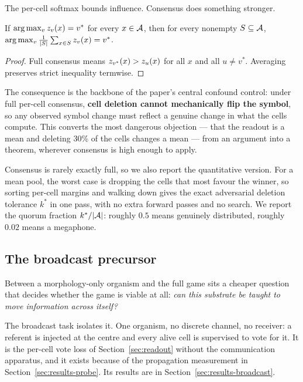 The per-cell softmax bounds influence. Consensus does something stronger.

\begin{proposition}
\label{prop:deletion}
If $\arg\max_v z_v(x) = v^{*}$ for every $x \in \mathcal{A}$, then for every
nonempty $S \subseteq \mathcal{A}$,
$\arg\max_v \frac{1}{|S|}\sum_{x \in S} z_v(x) = v^{*}$.
\end{proposition}

\begin{proof}
Full consensus means $z_{v^{*}}(x) > z_u(x)$ for all $x$ and all
$u \neq v^{*}$. Averaging preserves strict inequality termwise.
\end{proof}

The consequence is the backbone of the paper's central confound control: under
full per-cell consensus, \textbf{cell deletion cannot mechanically flip the
symbol}, so any observed symbol change must reflect a genuine change in what the
cells compute. This converts the most dangerous objection --- that the readout is
a mean and deleting 30\% of the cells changes a mean --- from an argument into a
theorem, wherever consensus is high enough to apply.

Consensus is rarely exactly full, so we also report the quantitative version. For
a mean pool, the worst case is dropping the cells that most favour the winner, so
sorting per-cell margins and walking down gives the exact adversarial deletion
tolerance $k^{*}$ in one pass, with no extra forward passes and no search. We
report the quorum fraction $k^{*}/|\mathcal{A}|$: roughly $0.5$ means genuinely
distributed, roughly $0.02$ means a megaphone.

\subsection{The broadcast precursor}
\label{sec:broadcast}

Between a morphology-only organism and the full game sits a cheaper question that
decides whether the game is viable at all: \emph{can this substrate be taught to
move information across itself?}

The broadcast task isolates it. One organism, no discrete channel, no receiver: a
referent is injected at the centre and every alive cell is supervised to vote for
it. It is the per-cell vote loss of Section~\ref{sec:readout} without the
communication apparatus, and it exists because of the propagation measurement in
Section~\ref{sec:results-probe}. Its results are in
Section~\ref{sec:results-broadcast}.

